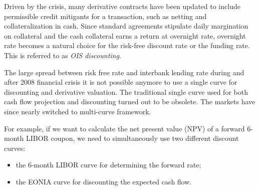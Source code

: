 Driven by the crisis, many derivative contracts have been updated to include permissible credit mitigants for a transaction, such as netting and collateralization in cash. Since standard agreements stipulate daily margination on collateral and the cash collateral earns a return at overnight rate, overnight rate becomes a natural choice for the risk-free discount rate or the funding rate. This is referred to as \emph{OIS discounting}.

The large spread between risk free rate and interbank lending rate during and after 2008 financial crisis it is not possible anymore to use a single curve for discounting and derivative valuation. The traditional single curve used for both  cash flow projection and discounting turned out to be obsolete. The markets have since nearly switched to multi-curve framework. 

For example, if we want to calculate the net present value (NPV) of a forward 6-month LIBOR coupon, we need to simultaneously use two different discount curves: 

\begin{itemize}
\tightlist
\item the 6-month LIBOR curve for determining the forward rate;
\item the EONIA curve for discounting the expected cash flow.
\end{itemize}


